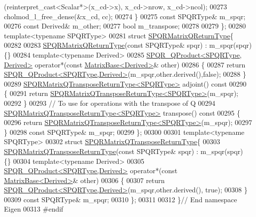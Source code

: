 \begin{DoxyCode}
      (reinterpret\_cast<Scalar*>(x\_cd->x), x\_cd->nrow, x\_cd->ncol);
00273     cholmod\_l\_free\_dense(&x\_cd, cc);
00274   \}
00275   \textcolor{keyword}{const} SPQRType& m\_spqr; 
00276   \textcolor{keyword}{const} Derived& m\_other; 
00277   \textcolor{keywordtype}{bool} m\_transpose; 
00278   
00279 \};
00280 \textcolor{keyword}{template}<\textcolor{keyword}{typename} SPQRType>
00281 \textcolor{keyword}{struct }\hyperlink{struct_eigen_1_1_s_p_q_r_matrix_q_return_type}{SPQRMatrixQReturnType}\{
00282   
00283   \hyperlink{struct_eigen_1_1_s_p_q_r_matrix_q_return_type}{SPQRMatrixQReturnType}(\textcolor{keyword}{const} SPQRType& spqr) : m\_spqr(spqr) \{\}
00284   \textcolor{keyword}{template}<\textcolor{keyword}{typename} Derived>
00285   \hyperlink{struct_eigen_1_1_s_p_q_r___q_product}{SPQR\_QProduct<SPQRType, Derived>} operator*(\textcolor{keyword}{const} 
      \hyperlink{group___core___module_class_eigen_1_1_matrix_base}{MatrixBase<Derived>}& other)
00286   \{
00287     \textcolor{keywordflow}{return} \hyperlink{struct_eigen_1_1_s_p_q_r___q_product}{SPQR\_QProduct<SPQRType,Derived>}(m\_spqr,other.derived(),\textcolor{keyword}{false});
00288   \}
00289   \hyperlink{struct_eigen_1_1_s_p_q_r_matrix_q_transpose_return_type}{SPQRMatrixQTransposeReturnType<SPQRType>} adjoint()\textcolor{keyword}{ const}
00290 \textcolor{keyword}{  }\{
00291     \textcolor{keywordflow}{return} \hyperlink{struct_eigen_1_1_s_p_q_r_matrix_q_transpose_return_type}{SPQRMatrixQTransposeReturnType<SPQRType>}(m\_spqr);
00292   \}
00293   \textcolor{comment}{// To use for operations with the transpose of Q}
00294   \hyperlink{struct_eigen_1_1_s_p_q_r_matrix_q_transpose_return_type}{SPQRMatrixQTransposeReturnType<SPQRType>} transpose()\textcolor{keyword}{ const}
00295 \textcolor{keyword}{  }\{
00296     \textcolor{keywordflow}{return} \hyperlink{struct_eigen_1_1_s_p_q_r_matrix_q_transpose_return_type}{SPQRMatrixQTransposeReturnType<SPQRType>}(m\_spqr);
00297   \}
00298   \textcolor{keyword}{const} SPQRType& m\_spqr;
00299 \};
00300 
00301 \textcolor{keyword}{template}<\textcolor{keyword}{typename} SPQRType>
00302 \textcolor{keyword}{struct }\hyperlink{struct_eigen_1_1_s_p_q_r_matrix_q_transpose_return_type}{SPQRMatrixQTransposeReturnType}\{
00303   \hyperlink{struct_eigen_1_1_s_p_q_r_matrix_q_transpose_return_type}{SPQRMatrixQTransposeReturnType}(\textcolor{keyword}{const} SPQRType& spqr) : m\_spqr(spqr) \{\}
00304   \textcolor{keyword}{template}<\textcolor{keyword}{typename} Derived>
00305   \hyperlink{struct_eigen_1_1_s_p_q_r___q_product}{SPQR\_QProduct<SPQRType,Derived>} operator*(\textcolor{keyword}{const} 
      \hyperlink{group___core___module_class_eigen_1_1_matrix_base}{MatrixBase<Derived>}& other)
00306   \{
00307     \textcolor{keywordflow}{return} \hyperlink{struct_eigen_1_1_s_p_q_r___q_product}{SPQR\_QProduct<SPQRType,Derived>}(m\_spqr,other.derived(), \textcolor{keyword}{true});
00308   \}
00309   \textcolor{keyword}{const} SPQRType& m\_spqr;
00310 \};
00311 
00312 \}\textcolor{comment}{// End namespace Eigen}
00313 \textcolor{preprocessor}{#endif}
\end{DoxyCode}
